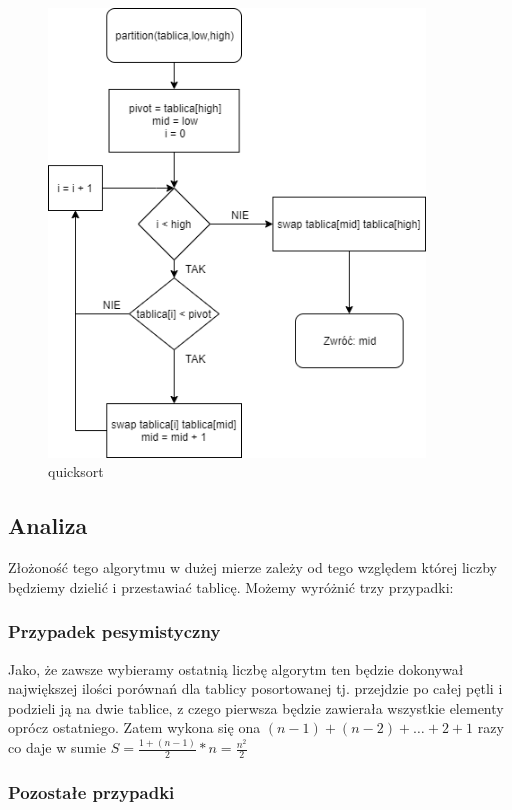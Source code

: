 \documentclass[11pt]{article}
\begin{document}
\begin{figure}
\centering
\includegraphics[width=100mm,scale=1.5]{Quicksort/Partition.png}
\caption{quicksort}
\end{figure}

\hypertarget{analiza-matematyczna}{%
\subsection{Analiza}\label{analiza-matematyczna}}

Złożoność tego algorytmu w dużej mierze zależy od tego względem której
liczby będziemy dzielić i przestawiać tablicę. Możemy wyróżnić trzy
przypadki:

\hypertarget{przypadek-pesymistyczny}{%
\subsubsection{Przypadek pesymistyczny}\label{przypadek-pesymistyczny}}

Jako, że zawsze wybieramy ostatnią liczbę algorytm ten będzie dokonywał
największej ilości porównań dla tablicy posortowanej tj. przejdzie po
całej pętli i podzieli ją na dwie tablice, z czego pierwsza będzie
zawierała wszystkie elementy oprócz ostatniego. Zatem wykona się ona $ (n-1) + (n-2) + \ldots{} + 2 + 1 $ razy co daje w sumie 
$ S = \frac{1 + (n-1)}{2} * n = \frac{n^{2}}{2}$

\hypertarget{pozostaux142e-przypadki}{%
\subsubsection{Pozostałe przypadki}\label{pozostaux142e-przypadki}}
\end{document}

